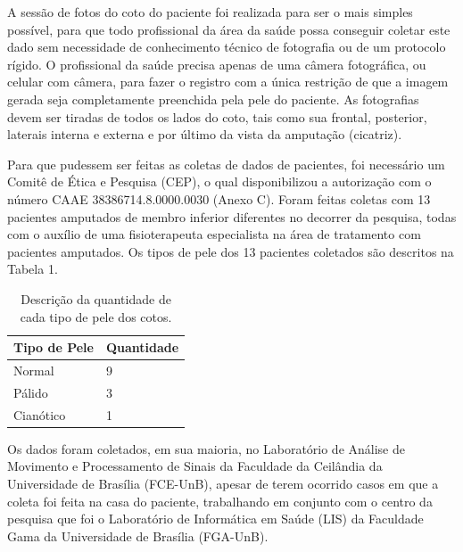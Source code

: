     A sessão de fotos do coto do paciente foi realizada para ser o mais simples possível, para que todo profissional da área da saúde possa conseguir coletar este dado sem necessidade de conhecimento técnico de fotografia ou de um protocolo rígido. O profissional da saúde precisa apenas de uma câmera fotográfica, ou celular com câmera, para fazer o registro com a única restrição de que a imagem gerada seja completamente preenchida pela pele do paciente. As fotografias devem ser tiradas de todos os lados do coto, tais como sua frontal, posterior, laterais interna e externa e por último da vista da amputação (cicatriz).

    Para que pudessem ser feitas as coletas de dados de pacientes, foi necessário um Comitê de Ética e Pesquisa (CEP), o qual disponibilizou a autorização com o número CAAE 38386714.8.0000.0030 (Anexo C). Foram feitas coletas com 13 pacientes amputados de membro inferior diferentes no decorrer da pesquisa, todas com o auxílio de uma fisioterapeuta especialista na área de tratamento com pacientes amputados. Os tipos de pele dos 13 pacientes coletados são descritos na Tabela 1.

    \begin{table}[H]
            \centering
            \label{tab01}
            \caption{Descrição da quantidade de cada tipo de pele dos cotos.}
            \begin{tabular}{|l|l|}
                \hline
                Tipo de Pele & Quantidade \\ \hline
                Normal       & 9          \\ \hline
                Pálido       & 3          \\ \hline
                Cianótico    & 1          \\ \hline
            \end{tabular} 
        \end{table}

    Os dados foram coletados, em sua maioria, no Laboratório de Análise de Movimento e Processamento de Sinais da Faculdade da Ceilândia da Universidade de Brasília (FCE-UnB), apesar de terem ocorrido casos em que a coleta foi feita na casa do paciente, trabalhando em conjunto com o centro da pesquisa que foi o Laboratório de Informática em Saúde (LIS) da Faculdade Gama da Universidade de Brasília (FGA-UnB). 




